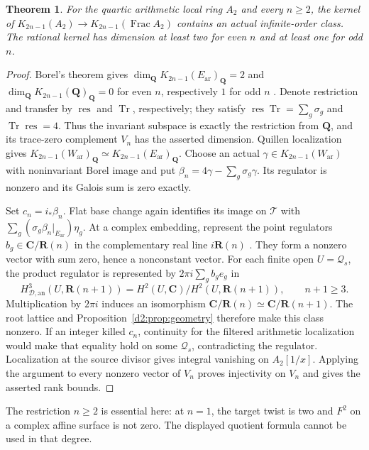 \documentclass[11pt,a4paper]{amsart}
\numberwithin{equation}{section}
\newtheorem{theorem}{Theorem}[section]
\theoremstyle{definition}
\theoremstyle{remark}
\newcommand{\Q}{\mathbf Q}
\newcommand{\R}{\mathbf R}
\newcommand{\C}{\mathbf C}
\newcommand{\Frac}{\operatorname{Frac}}
\newcommand{\HD}{H_{\mathcal D,\mathrm{an}}}
\begin{document}
\begin{theorem}
\label{d2ext:twodimalloddgeometric}
For the quartic arithmetic local ring $A_2$ and every $n\ge2$, the kernel of
$K_{2n-1}(A_2)\to K_{2n-1}(\Frac A_2)$ contains an actual infinite-order
class. The rational kernel has dimension at least two for even $n$
and at least one for odd $n$.
\end{theorem}
\begin{proof}
Borel's theorem gives $\dim_{\Q}K_{2n-1}(E_{\mathrm{ar}})_{\Q}=2$ and
$\dim_{\Q}K_{2n-1}(\Q)_{\Q}=0$ for even $n$, respectively $1$
for odd $n$ \cite[Proposition~12.2]{Borel}. Denote restriction and transfer by $\operatorname{res}$
and $\operatorname{Tr}$, respectively; they satisfy
$\operatorname{res}\operatorname{Tr}=\sum_g\sigma_g$ and
$\operatorname{Tr}\operatorname{res}=4$. Thus the invariant subspace
is exactly the restriction from $\Q$, and its trace-zero complement
$V_n$ has the asserted dimension. Quillen localization \cite{Quillen,Weibel} gives
$K_{2n-1}(W_{\mathrm{ar}})_{\Q}\simeq K_{2n-1}(E_{\mathrm{ar}})_{\Q}$.
Choose an actual $\gamma\in K_{2n-1}(W_{\mathrm{ar}})$ with noninvariant Borel
image and put $\beta_n=4\gamma-\sum_g\sigma_g\gamma$.
Its regulator is nonzero and its Galois sum is zero exactly.

Set $c_n=i_*\beta_n$. Flat base change again identifies its image
on $\mathcal T$ with $\sum_g(\sigma_g\beta_n|_{E_{\mathrm{ar}}})\eta_g$.
At a complex embedding, represent the point regulators
$b_g\in\C/\R(n)$ in the complementary real line $i\R(n)$
\cite[Section~6]{BunkeTamme}.
They form a nonzero vector with sum zero, hence a nonconstant vector.
For each finite open $U=\mathcal Q_s$, the product regulator is
represented by $2\pi i\sum_gb_ge_g$ in
\[
 \HD^3(U,\R(n+1))=H^2(U,\C)/H^2(U,\R(n+1)),
 \qquad n+1\ge3.
\]
Multiplication by $2\pi i$ induces an isomorphism
$\C/\R(n)\simeq\C/\R(n+1)$. The root lattice and
Proposition~\ref{d2:prop:geometry} therefore make this class
nonzero. If an integer killed $c_n$, continuity for the filtered
arithmetic localization would make that equality hold on some
$\mathcal Q_s$, contradicting the regulator. Localization at the
source divisor gives integral vanishing on $A_2[1/x]$.
Applying the argument to every nonzero vector of $V_n$ proves
injectivity on $V_n$ and gives the asserted rank bounds.
\end{proof}

The restriction $n\ge2$ is essential here: at $n=1$, the target
twist is two and $F^2$ on a complex affine surface is not zero.
The displayed quotient formula cannot be used in that degree.
\end{document}
